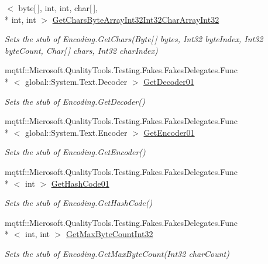 \begin{DoxyCompactItemize}
$<$ byte\mbox{[}$\,$\mbox{]}, int, int, char\mbox{[}$\,$\mbox{]}, \\*
int, int $>$ \hyperlink{class_system_1_1_text_1_1_fakes_1_1_stub_encoding_ab3409d03aaad00bddb0cf60d900b22b1}{Get\-Chars\-Byte\-Array\-Int32\-Int32\-Char\-Array\-Int32}
\begin{DoxyCompactList}\small\item\em Sets the stub of Encoding.\-Get\-Chars(\-Byte\mbox{[}$\,$\mbox{]} bytes, Int32 byte\-Index, Int32 byte\-Count, Char\mbox{[}$\,$\mbox{]} chars, Int32 char\-Index)\end{DoxyCompactList}\item 
mqttf\-::\-Microsoft.\-Quality\-Tools.\-Testing.\-Fakes.\-Fakes\-Delegates.\-Func\\*
$<$ global\-::\-System.\-Text.\-Decoder $>$ \hyperlink{class_system_1_1_text_1_1_fakes_1_1_stub_encoding_a9ac4b003f84ff8ed0cb341441bb1a367}{Get\-Decoder01}
\begin{DoxyCompactList}\small\item\em Sets the stub of Encoding.\-Get\-Decoder()\end{DoxyCompactList}\item 
mqttf\-::\-Microsoft.\-Quality\-Tools.\-Testing.\-Fakes.\-Fakes\-Delegates.\-Func\\*
$<$ global\-::\-System.\-Text.\-Encoder $>$ \hyperlink{class_system_1_1_text_1_1_fakes_1_1_stub_encoding_ab2faf1b17b03875f3a8359771472e889}{Get\-Encoder01}
\begin{DoxyCompactList}\small\item\em Sets the stub of Encoding.\-Get\-Encoder()\end{DoxyCompactList}\item 
mqttf\-::\-Microsoft.\-Quality\-Tools.\-Testing.\-Fakes.\-Fakes\-Delegates.\-Func\\*
$<$ int $>$ \hyperlink{class_system_1_1_text_1_1_fakes_1_1_stub_encoding_ae16fc2ec75b3501a6ff135b9a403fe43}{Get\-Hash\-Code01}
\begin{DoxyCompactList}\small\item\em Sets the stub of Encoding.\-Get\-Hash\-Code()\end{DoxyCompactList}\item 
mqttf\-::\-Microsoft.\-Quality\-Tools.\-Testing.\-Fakes.\-Fakes\-Delegates.\-Func\\*
$<$ int, int $>$ \hyperlink{class_system_1_1_text_1_1_fakes_1_1_stub_encoding_ada66696a8a62921b104bbfd9d83a00a7}{Get\-Max\-Byte\-Count\-Int32}
\begin{DoxyCompactList}\small\item\em Sets the stub of Encoding.\-Get\-Max\-Byte\-Count(\-Int32 char\-Count)\end{DoxyCompactList}\item 

\end{DoxyCompactItemize}
